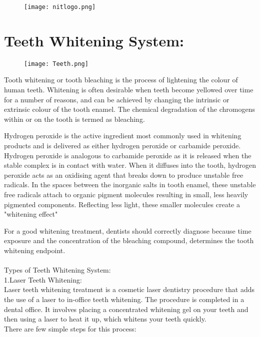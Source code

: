 \documentclass[a4paper,12pt]{article}
\author{Aashutosh Patel \\ Roll no- 21111001}
\begin{document}
	\begin{figure}
		\centering
		\texttt{[image: nitlogo.png]}
	\end{figure}
	\maketitle
	\clearpage
	\large
	\section{Teeth Whitening System:} 	\begin{figure}[h]
		\texttt{[image: Teeth.png]}
	\end{figure} 
Tooth whitening or tooth bleaching is the process of lightening the colour of human teeth. Whitening is often desirable when teeth become yellowed over time for a number of reasons, and can be achieved by changing the intrinsic or extrinsic colour of the tooth enamel. The chemical degradation of the chromogens within or on the tooth is termed as bleaching.


Hydrogen peroxide is the active ingredient most commonly used in whitening products and is delivered as either hydrogen peroxide or carbamide peroxide. Hydrogen peroxide is analogous to carbamide peroxide as it is released when the stable complex is in contact with water. When it diffuses into the tooth, hydrogen peroxide acts as an oxidising agent that breaks down to produce unstable free radicals. In the spaces between the inorganic salts in tooth enamel, these unstable free radicals attach to organic pigment molecules resulting in small, less heavily pigmented components. Reflecting less light, these smaller molecules create a "whitening effect"

For a good whitening treatment, dentists should correctly diagnose because time exposure and the concentration of the bleaching compound, determines the tooth whitening endpoint.  
\\
\\

Types of Teeth Whitening System:
\\

1.Laser Teeth Whitening:
\\
Laser teeth whitening treatment is a cosmetic laser dentistry procedure that adds the use of a laser to in-office teeth whitening.
The procedure is completed in a dental office. It involves placing a concentrated whitening gel on your teeth and then using a laser to heat it up, which whitens your teeth quickly.
\\
There are few simple steps for this process:
\end{document}
